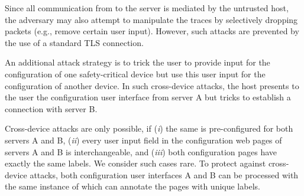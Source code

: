  Since all communication from \device to the server is mediated by the untrusted host, the adversary may also attempt to manipulate the traces by selectively dropping packets (e.g., remove certain user input). However, such attacks are prevented by the use of a standard TLS connection.

 An additional attack strategy is to trick the user to provide input for the configuration of one safety-critical device but use this user input for the configuration of another device. In such cross-device attacks, the host presents to the user the configuration user interface from server A but tricks \device to establish a connection with server B.

Cross-device attacks are only possible, if (\emph{i}) the same \device is pre-configured for both servers A and B, (\emph{ii}) every user input field in the configuration web pages of servers A and B is interchangeable, and (\emph{iii}) both configuration pages have exactly the same labels. We consider such cases rare. 
To protect against cross-device attacks, both configuration user interfaces A and B can be processed with the same instance of \tool which can annotate the pages with unique labels.




